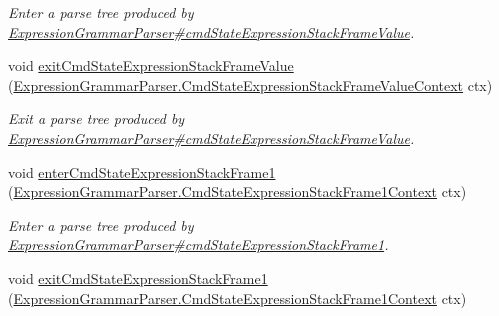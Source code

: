 \begin{DoxyCompactItemize}
\begin{DoxyCompactList}\small\item\em Enter a parse tree produced by \hyperlink{classgov_1_1nasa_1_1jpf_1_1inspector_1_1server_1_1expression_1_1parser_1_1_expression_grammar_parser_a61b18a81f2b5ca691f9645b3a1fb203c}{Expression\+Grammar\+Parser\#cmd\+State\+Expression\+Stack\+Frame\+Value}. \end{DoxyCompactList}\item 
void \hyperlink{interfacegov_1_1nasa_1_1jpf_1_1inspector_1_1server_1_1expression_1_1parser_1_1_expression_grammar_listener_a3fedcb2213d54a87da3e673c5c258d4c}{exit\+Cmd\+State\+Expression\+Stack\+Frame\+Value} (\hyperlink{classgov_1_1nasa_1_1jpf_1_1inspector_1_1server_1_1expression_1_1parser_1_1_expression_grammar_pa27eac9bb10e329b6f1427633e5ce16ca}{Expression\+Grammar\+Parser.\+Cmd\+State\+Expression\+Stack\+Frame\+Value\+Context} ctx)
\begin{DoxyCompactList}\small\item\em Exit a parse tree produced by \hyperlink{classgov_1_1nasa_1_1jpf_1_1inspector_1_1server_1_1expression_1_1parser_1_1_expression_grammar_parser_a61b18a81f2b5ca691f9645b3a1fb203c}{Expression\+Grammar\+Parser\#cmd\+State\+Expression\+Stack\+Frame\+Value}. \end{DoxyCompactList}\item 
void \hyperlink{interfacegov_1_1nasa_1_1jpf_1_1inspector_1_1server_1_1expression_1_1parser_1_1_expression_grammar_listener_afe9aed68849e929563a4d92dc64006a5}{enter\+Cmd\+State\+Expression\+Stack\+Frame1} (\hyperlink{classgov_1_1nasa_1_1jpf_1_1inspector_1_1server_1_1expression_1_1parser_1_1_expression_grammar_pabec1adacda521b9e6ed9ea64caf537b4}{Expression\+Grammar\+Parser.\+Cmd\+State\+Expression\+Stack\+Frame1\+Context} ctx)
\begin{DoxyCompactList}\small\item\em Enter a parse tree produced by \hyperlink{classgov_1_1nasa_1_1jpf_1_1inspector_1_1server_1_1expression_1_1parser_1_1_expression_grammar_parser_a7b51fc0f0baff269b98a4705322e2242}{Expression\+Grammar\+Parser\#cmd\+State\+Expression\+Stack\+Frame1}. \end{DoxyCompactList}\item 
void \hyperlink{interfacegov_1_1nasa_1_1jpf_1_1inspector_1_1server_1_1expression_1_1parser_1_1_expression_grammar_listener_a3164080004cb1851d161255b52ff70a7}{exit\+Cmd\+State\+Expression\+Stack\+Frame1} (\hyperlink{classgov_1_1nasa_1_1jpf_1_1inspector_1_1server_1_1expression_1_1parser_1_1_expression_grammar_pabec1adacda521b9e6ed9ea64caf537b4}{Expression\+Grammar\+Parser.\+Cmd\+State\+Expression\+Stack\+Frame1\+Context} ctx)

\end{DoxyCompactItemize}
